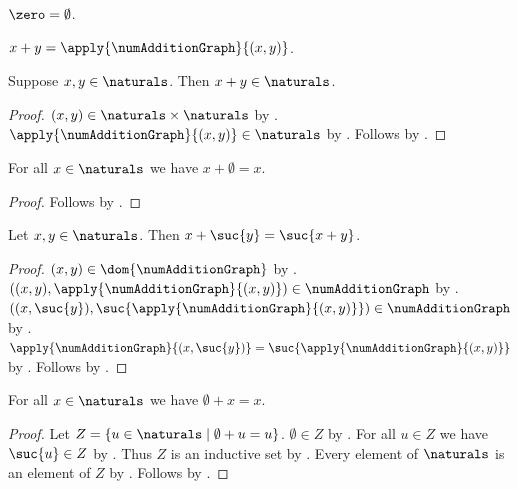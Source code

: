 \begin{abbreviation}\label{num_zero_is_emptyset}
    $\zero = \emptyset$.
\end{abbreviation}

\begin{definition}\label{num_addition_is_set}
    $x+y=\apply{\numAdditionGraph}{(x,y)}$.
\end{definition}

\begin{classification}\label{num_addition_on_naturals}
    Suppose $x,y\in\naturals$.
    Then $x+y\in\naturals$.
\end{classification}
\begin{proof}
    $(x,y)\in\naturals\times\naturals$
        by .
    $\apply{\numAdditionGraph}{(x,y)}\in\naturals$
        by .
    Follows by .
\end{proof}

\begin{proposition}\label{num_addition_zero_right}
    For all $x\in\naturals$ we have $x+\emptyset=x$.
\end{proposition}
\begin{proof}
    Follows by .
\end{proof}

\begin{proposition}\label{num_addition_successor_right}
    Let $x,y\in\naturals$.
    Then $x+\suc{y}=\suc{x+y}$.
\end{proposition}
\begin{proof}
    $(x,y)\in\dom{\numAdditionGraph}$
        by .
    $((x,y),\apply{\numAdditionGraph}{(x,y)})
        \in\numAdditionGraph$
        by .
    $((x,\suc{y}),\suc{\apply{\numAdditionGraph}{(x,y)}})
        \in\numAdditionGraph$
        by .
    $\apply{\numAdditionGraph}{(x,\suc{y})}
        =\suc{\apply{\numAdditionGraph}{(x,y)}}$
        by .
    Follows by .
\end{proof}

\begin{proposition}\label{num_addition_zero_left}
    For all $x\in\naturals$ we have $\emptyset+x=x$.
\end{proposition}
\begin{proof}
    Let $Z=\{u\in\naturals\mid \text{$\emptyset+u=u$}\}$.
    $\emptyset\in Z$ by .
    For all $u\in Z$ we have $\suc{u}\in Z$
        by .
    Thus $Z$ is an inductive set by .
    Every element of $\naturals$ is an element of $Z$
        by .
    Follows by \auto.
\end{proof}

